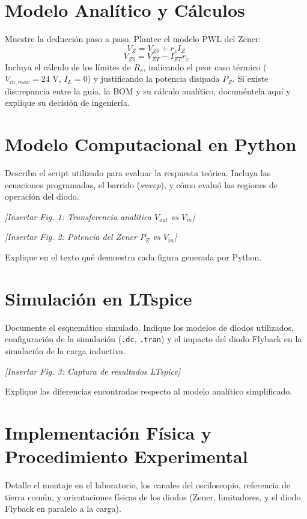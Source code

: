 \documentclass[10pt, a4paper, twocolumn]{article}
\begin{document}
\section{Modelo Analítico y Cálculos}
Muestre la deducción paso a paso. Plantee el modelo PWL del Zener:
\begin{equation}
    V_Z = V_{Z0} + r_z I_Z
\end{equation}
\begin{equation}
    V_{Z0} = V_{ZT} - I_{ZT} r_z
\end{equation}
Incluya el cálculo de los límites de $R_s$, indicando el peor caso térmico ($V_{in,max}=24\text{ V}$, $I_L=0$) y justificando la potencia disipada $P_Z$. Si existe discrepancia entre la guía, la BOM y su cálculo analítico, documéntela aquí y explique su decisión de ingeniería.

\section{Modelo Computacional en Python}
Describa el script utilizado para evaluar la respuesta teórica. Incluya las ecuaciones programadas, el barrido (\textit{sweep}), y cómo evaluó las regiones de operación del diodo.

\textit{[Insertar Fig. 1: Transferencia analítica $V_{out}$ vs $V_{in}$]}

\textit{[Insertar Fig. 2: Potencia del Zener $P_Z$ vs $V_{in}$]}

Explique en el texto qué demuestra cada figura generada por Python.

\section{Simulación en LTspice}
Documente el esquemático simulado. Indique los modelos de diodos utilizados, configuración de la simulación (\texttt{.dc}, \texttt{.tran}) y el impacto del diodo Flyback en la simulación de la carga inductiva.

\textit{[Insertar Fig. 3: Captura de resultados LTspice]}

Explique las diferencias encontradas respecto al modelo analítico simplificado.

\section{Implementación Física y Procedimiento Experimental}
Detalle el montaje en el laboratorio, los canales del osciloscopio, referencia de tierra común, y orientaciones físicas de los diodos (Zener, limitadores, y el diodo Flyback en paralelo a la carga).
\end{document}
